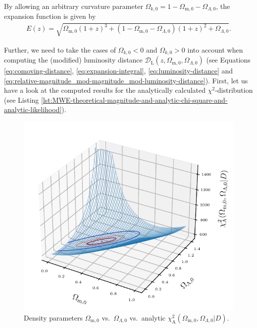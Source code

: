 By allowing an arbitrary curvature parameter $\Omega_{k,0} = 1 - \Omega_{\text{m},0} - \Omega_{\Lambda,0}$, the expansion function is given by 
\begin{align}
    E(z) = \sqrt{\Omega_{\text{m}, 0} (1 + z)^3 + (1 - \Omega_{\text{m},0} - \Omega_{\Lambda,0})(1 + z)^2 + \Omega_{\Lambda,0}}. \label{eq:expansion-function-arbitrary-curvature} 
\end{align}

\noindent Further, we need to take the cases of $\Omega_{k,0} < 0$ and $\Omega_{k,0} > 0$ into account when computing the (modified) luminosity distance $\mathcal{D}_{\text{L}}(z, \Omega_{\text{m},0}, \Omega_{\Lambda,0})$ (see Equations \eqref{eq:comoving-distance}, \eqref{eq:expansion-integral}, \eqref{eq:luminosity-distance} and \eqref{eq:relative-magnitude_mod-magnitude_mod-luminosity-distance}). 
First, let us have a look at the computed results for the analytically calculated $\chi^2$-distribution (see Listing \ref{lst:MWE-theoretical-magnitude-and-analytic-chi-square-and-analytic-likelihood}).

\begin{figure}[H]
    \centering
    \includegraphics[scale=1.3]{figures/plots/PDF/Lambda-CDM-analytic-chi2_Omega-m0-vs-Omega-Lambda0-vs-chi2.pdf}
    \caption{Density parameters $\Omega_{\text{m},0}$ vs.\ $\Omega_{\Lambda,0}$ vs.\ analytic $\chi_{\text{A}}^2(\Omega_{\text{m},0}, \Omega_{\Lambda,0} \vert D)$.}
    \label{fig:Lambda-CDM-analytic-chi2_Omega-m0-vs-Omega-Lambda0-vs-chi2}
\end{figure}


